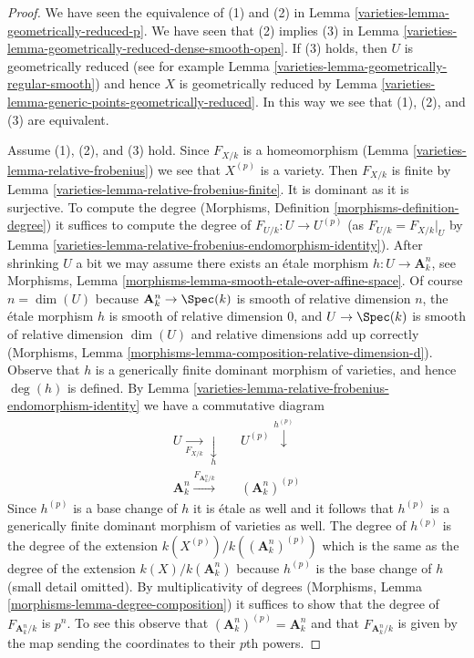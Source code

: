 \begin{proof}

We have seen the equivalence of (1) and (2) in
Lemma \ref{varieties-lemma-geometrically-reduced-p}.
We have seen that (2) implies (3) in
Lemma \ref{varieties-lemma-geometrically-reduced-dense-smooth-open}.
If (3) holds, then $U$ is geometrically reduced
(see for example Lemma \ref{varieties-lemma-geometrically-regular-smooth})
and hence $X$ is geometrically reduced by
Lemma \ref{varieties-lemma-generic-points-geometrically-reduced}.
In this way we see that (1), (2), and (3) are equivalent.

\medskip\noindent
Assume (1), (2), and (3) hold. Since $F_{X/k}$ is a homeomorphism
(Lemma \ref{varieties-lemma-relative-frobenius}) we see that $X^{(p)}$ is a variety.
Then $F_{X/k}$ is finite by Lemma \ref{varieties-lemma-relative-frobenius-finite}.
It is dominant as it is surjective. To compute the degree
(Morphisms, Definition \ref{morphisms-definition-degree})
it suffices to compute the degree of $F_{U/k} : U \to U^{(p)}$
(as $F_{U/k} = F_{X/k}|_U$ by
Lemma \ref{varieties-lemma-relative-frobenius-endomorphism-identity}).
After shrinking $U$ a bit we may assume there exists an
\'etale morphism $h : U \to \mathbf{A}^n_k$, see
Morphisms, Lemma \ref{morphisms-lemma-smooth-etale-over-affine-space}.
Of course $n = \dim(U)$ because
$\mathbf{A}^n_k \to \Spec(k)$ is smooth of relative dimension $n$,
the \'etale morphism $h$ is smooth of relative dimension $0$, and
$U \to \Spec(k)$ is smooth of relative dimension $\dim(U)$
and relative dimensions add up correctly
(Morphisms, Lemma \ref{morphisms-lemma-composition-relative-dimension-d}).
Observe that $h$ is a generically finite dominant morphism
of varieties, and hence $\deg(h)$ is defined.
By Lemma \ref{varieties-lemma-relative-frobenius-endomorphism-identity}
we have a commutative diagram
$$
\begin{array}{ccc}U \underset{F_{X/k}}{\longrightarrow}\underset{h}{\downarrow} &  & U^{(p)} \overset{h^{(p)}}{\downarrow} \\ \mathbf{A}^n_k \overset{F_{\mathbf{A}^n_k/k}}{\longrightarrow} &  & (\mathbf{A}^n_k)^{(p)}\end{array}
$$
Since $h^{(p)}$ is a base change of $h$ it is \'etale as well
and it follows that $h^{(p)}$ is a generically finite dominant
morphism of varieties as well. The degree of $h^{(p)}$ is the
degree of the extension $k(X^{(p)})/k((\mathbf{A}^n_k)^{(p)})$
which is the same as the degree of the extension $k(X)/k(\mathbf{A}^n_k)$
because $h^{(p)}$ is the base change of $h$ (small detail omitted).
By multiplicativity of degrees
(Morphisms, Lemma \ref{morphisms-lemma-degree-composition})
it suffices to show that the degree of $F_{\mathbf{A}^n_k/k}$
is $p^n$. To see this observe that
$(\mathbf{A}^n_k)^{(p)} = \mathbf{A}^n_k$ and that
$F_{\mathbf{A}^n_k/k}$ is given by the map sending the
coordinates to their $p$th powers.
\end{proof}

